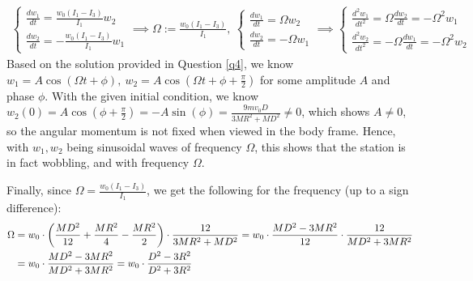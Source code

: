 \documentclass{article}
\DeclarePairedDelimiter{\paran}{(}{)}%
\begin{document}
\begin{align}
    \begin{cases}
        \frac{dw_1}{dt}=\frac{w_0(I_1-I_3)}{I_1}w_2\\
        \frac{dw_2}{dt}=-\frac{w_0(I_1-I_3)}{I_1}w_1
    \end{cases} \implies \Omega := \frac{w_0(I_1-I_3)}{I_1},\ \begin{cases}
        \frac{dw_1}{dt}=\Omega w_2\\
        \frac{dw_2}{dt}=-\Omega w_1
    \end{cases}\implies \begin{cases}
        \frac{d^2w_1}{dt^2}=\Omega \frac{dw_2}{dt} = -\Omega^2 w_1\\
        \frac{d^2w_2}{dt^2}=-\Omega \frac{dw_1}{dt} = -\Omega^2 w_2
    \end{cases}
\end{align}
Based on the solution provided in Question \ref{q4}, we know $w_1 = A\cos(\Omega t+\phi),\ w_2=A\cos(\Omega t+\phi+\frac{\pi}{2})$ for some amplitude $A$ and phase $\phi$. With the given initial condition, we know $w_2(0)=A\cos(\phi+\frac{\pi}{2}) = -A\sin(\phi) =\frac{9mv_0D}{3MR^2+MD^2}\neq 0$, which shows $A\neq 0$, so the angular momentum is not fixed when viewed in the body frame. Hence, with $w_1,w_2$ being sinusoidal waves of frequency $\Omega$, this shows that the station is in fact wobbling, and with frequency $\Omega$.

Finally, since $\Omega = \frac{w_0(I_1-I_3)}{I_1}$, we get the following for the frequency (up to a sign difference):
\begin{align}
    \Omega &= w_0\cdot \paran*{\frac{MD^2}{12}+\frac{MR^2}{4}-\frac{MR^2}{2}}\cdot\frac{12}{3MR^2+MD^2} = w_0\cdot\frac{MD^2-3MR^2}{12}\cdot \frac{12}{MD^2+3MR^2} \\
    &= w_0\cdot\frac{MD^2-3MR^2}{MD^2+3MR^2} = w_0\cdot\frac{D^2-3R^2}{D^2+3R^2}
\end{align}
\end{document}
